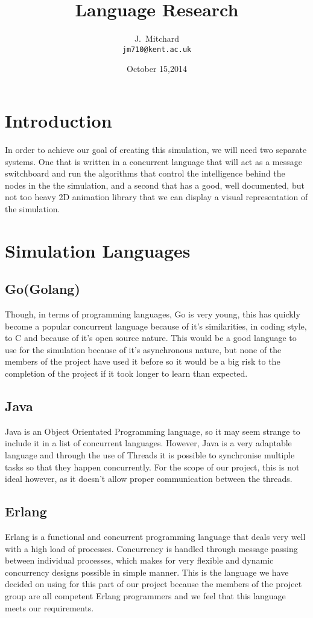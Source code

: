 \documentclass[a4paper,12pt]{article}
\begin{document}
\title{Language Research}
\author{J.~Mitchard\\{\small\tt jm710@kent.ac.uk}}
\date{October 15,2014}

\maketitle

\section{Introduction}
In order to achieve our goal of creating this simulation, we will need two separate systems. One that is written in a concurrent language that will act as a message switchboard and run the algorithms that control the intelligence behind the  nodes in the the simulation, and a second that has a good, well documented, but not too heavy 2D animation library that we can display a visual representation of the simulation.

\section{Simulation Languages}
\subsection{Go(Golang)}
Though, in terms of programming languages, Go is very young, this has quickly become a popular concurrent language because of it’s similarities, in coding style, to C and because of it’s open source nature. This would be a good language to use for the simulation because of it’s asynchronous nature, but none of the members of the project have used it before so it would be a big risk to the completion of the project if it took longer to learn than expected.
\subsection{Java}
Java is an Object Orientated Programming language, so it may seem strange to include it in a list of concurrent languages. However, Java is a very adaptable language and through the use of Threads it is possible to synchronise multiple tasks so that they happen concurrently. For the scope of our project, this is not ideal however, as it doesn’t allow proper communication between the threads.

\subsection{Erlang}
Erlang is a functional and concurrent programming language that deals very well with a high load of processes. Concurrency is handled through message passing between individual processes, which makes for very flexible and dynamic concurrency designs possible in simple manner. This is the language we have decided on using for this part of our project because the members of the project group are all competent  Erlang programmers and we feel that this language meets our requirements.
\end{document}
